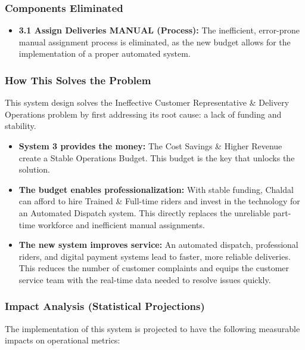 \documentclass[12pt,a4paper]{article}
\begin{document}
\subsubsection{Components Eliminated}
\begin{tcolorbox}[colback=red!5!white,colframe=red!75!black,title=Eliminated]
\begin{itemize}
    \item \textbf{3.1 Assign Deliveries MANUAL (Process):} The inefficient, error-prone manual assignment process is eliminated, as the new budget allows for the implementation of a proper automated system.
\end{itemize}
\end{tcolorbox}

\subsubsection{How This Solves the Problem}
This system design solves the Ineffective Customer Representative \& Delivery Operations problem by first addressing its root cause: a lack of funding and stability.
\begin{itemize}[leftmargin=*]
  \item \textbf{System 3 provides the money:} The Cost Savings \& Higher Revenue create a Stable Operations Budget. This budget is the key that unlocks the solution.
  \item \textbf{The budget enables professionalization:} With stable funding, Chaldal can afford to hire Trained \& Full-time riders and invest in the technology for an Automated Dispatch system. This directly replaces the unreliable part-time workforce and inefficient manual assignments.
  \item \textbf{The new system improves service:} An automated dispatch, professional riders, and digital payment systems lead to faster, more reliable deliveries. This reduces the number of customer complaints and equips the customer service team with the real-time data needed to resolve issues quickly.
\end{itemize}

\subsubsection{Impact Analysis (Statistical Projections)}
The implementation of this system is projected to have the following measurable impacts on operational metrics:
\end{document}
